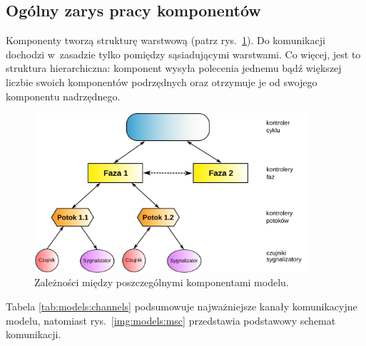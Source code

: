 \documentclass{pracamgr}
\newcommand{\imgr}[1]{rys.~\ref{#1}}
\theoremstyle{plain}
\begin{document}
\subsection{Ogólny zarys pracy komponentów}
\label{ss:models:models:summary}
Komponenty tworzą strukturę warstwową (patrz \imgr{img:hierarchy}). Do
komunikacji dochodzi w~zasadzie tylko pomiędzy sąsiadującymi
warstwami. Co więcej, jest to struktura hierarchiczna: komponent
wysyła polecenia jednemu bądź większej liczbie swoich komponentów
podrzędnych oraz otrzymuje je od swojego komponentu nadrzędnego.
\begin{figure}[h]
  \centering
  \includegraphics[width=0.9\textwidth]{img/models-hierarchy}
  \caption{Zależności między poszczególnymi komponentami modelu.}
  \label{img:hierarchy}
\end{figure}

Tabela \ref{tab:models:channels} podsumowuje najważniejsze kanały
komunikacyjne modelu, natomiast \imgr{img:models:msc} przedstawia
podstawowy schemat komunikacji.
\end{document}
